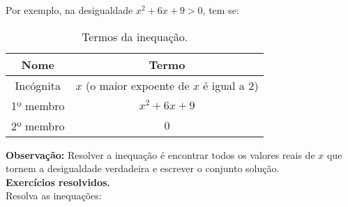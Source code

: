 	Por exemplo, na desigualdade $x^2 + 6x + 9 > 0$, tem se:
	
	\begin{table}[htbp]
		\centering
		\caption{Termos da inequação.}
		\begin{tabular}{cc}
			\hline
			Nome &  Termo \bigstrut\\
			\hline
			Incógnita  & $x$ (o maior expoente de $x$ é igual a $2$) \bigstrut\\
			1º membro & $x^2 + 6x + 9$ \bigstrut\\
			2º membro &  $0$ \\
            \hline
		\end{tabular}%
		\label{tab:addlabel}%
	\end{table}%
 
	\noindent
	\textbf{Observação:} Resolver a inequação é encontrar todos os valores reais  de $x$ que tornem a desigualdade verdadeira e escrever o conjunto solução.\\
    \noindent
	\textbf{Exercícios resolvidos.}\\
	Resolva as inequações:
